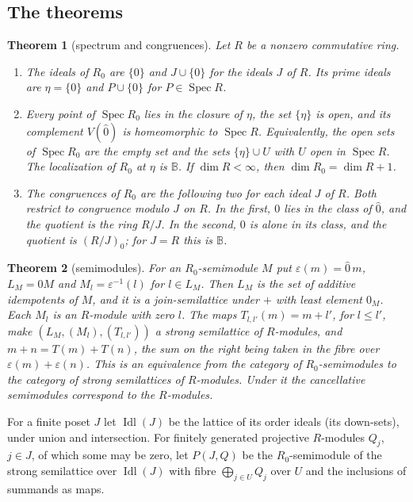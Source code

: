 \documentclass[11pt]{amsart}
\newtheorem{theorem}{Theorem}
\theoremstyle{remark}
\newcommand{\B}{\mathbb B}
\newcommand{\oz}{\widehat{0}}
\DeclareMathOperator{\Spec}{Spec}
\DeclareMathOperator{\Idl}{Idl}
\begin{document}
\subsection{The theorems}

\begin{theorem}[spectrum and congruences]\label{thm:spec}
Let $R$ be a nonzero commutative ring.
\begin{enumerate}
\item[(a)] The ideals of $R_0$ are $\{0\}$ and $J\cup\{0\}$ for the ideals $J$ of $R$. Its prime ideals are $\eta=\{0\}$ and $P\cup\{0\}$ for $P\in\Spec R$.
\item[(b)] Every point of $\Spec R_0$ lies in the closure of $\eta$, the set $\{\eta\}$ is open, and its complement $V(\oz)$ is homeomorphic to $\Spec R$. Equivalently, the open sets of $\Spec R_0$ are the empty set and the sets $\{\eta\}\cup U$ with $U$ open in $\Spec R$. The localization of $R_0$ at $\eta$ is $\B$. If $\dim R<\infty$, then $\dim R_0=\dim R+1$.
\item[(c)] The congruences of $R_0$ are the following two for each ideal $J$ of $R$. Both restrict to congruence modulo $J$ on $R$. In the first, $0$ lies in the class of $\oz$, and the quotient is the ring $R/J$. In the second, $0$ is alone in its class, and the quotient is $(R/J)_0$; for $J=R$ this is $\B$.
\end{enumerate}
\end{theorem}

\begin{theorem}[semimodules]\label{thm:mod}
For an $R_0$-semimodule $M$ put $\varepsilon(m)=\oz\,m$, $L_M=\oz M$ and $M_l=\varepsilon^{-1}(l)$ for $l\in L_M$. Then $L_M$ is the set of additive idempotents of $M$, and it is a join-semilattice under $+$ with least element $0_M$. Each $M_l$ is an $R$-module with zero $l$. The maps $T_{l,l'}(m)=m+l'$, for $l\le l'$, make $(L_M,(M_l),(T_{l,l'}))$ a strong semilattice of $R$-modules, and $m+n=T(m)+T(n)$, the sum on the right being taken in the fibre over $\varepsilon(m)+\varepsilon(n)$. This is an equivalence from the category of $R_0$-semimodules to the category of strong semilattices of $R$-modules. Under it the cancellative semimodules correspond to the $R$-modules.
\end{theorem}

For a finite poset $J$ let $\Idl(J)$ be the lattice of its order ideals (its down-sets), under union and intersection. For finitely generated projective $R$-modules $Q_j$, $j\in J$, of which some may be zero, let $P(J,Q)$ be the $R_0$-semimodule of the strong semilattice over $\Idl(J)$ with fibre $\bigoplus_{j\in U}Q_j$ over $U$ and the inclusions of summands as maps.
\end{document}
